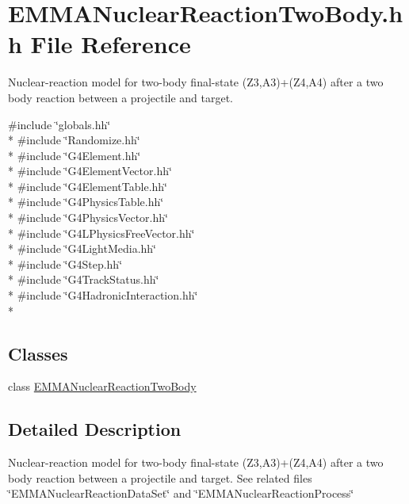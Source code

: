 \hypertarget{EMMANuclearReactionTwoBody_8hh}{\section{E\-M\-M\-A\-Nuclear\-Reaction\-Two\-Body.\-hh File Reference}
\label{EMMANuclearReactionTwoBody_8hh}
}


Nuclear-\/reaction model for two-\/body final-\/state (Z3,A3)+(Z4,A4) after a two body reaction between a projectile and target.  


{\ttfamily \#include \char`\"{}globals.\-hh\char`\"{}}\\*
{\ttfamily \#include \char`\"{}Randomize.\-hh\char`\"{}}\\*
{\ttfamily \#include \char`\"{}G4\-Element.\-hh\char`\"{}}\\*
{\ttfamily \#include \char`\"{}G4\-Element\-Vector.\-hh\char`\"{}}\\*
{\ttfamily \#include \char`\"{}G4\-Element\-Table.\-hh\char`\"{}}\\*
{\ttfamily \#include \char`\"{}G4\-Physics\-Table.\-hh\char`\"{}}\\*
{\ttfamily \#include \char`\"{}G4\-Physics\-Vector.\-hh\char`\"{}}\\*
{\ttfamily \#include \char`\"{}G4\-L\-Physics\-Free\-Vector.\-hh\char`\"{}}\\*
{\ttfamily \#include \char`\"{}G4\-Light\-Media.\-hh\char`\"{}}\\*
{\ttfamily \#include \char`\"{}G4\-Step.\-hh\char`\"{}}\\*
{\ttfamily \#include \char`\"{}G4\-Track\-Status.\-hh\char`\"{}}\\*
{\ttfamily \#include \char`\"{}G4\-Hadronic\-Interaction.\-hh\char`\"{}}\\*
\subsection*{Classes}
\begin{DoxyCompactItemize}
\item 
class \hyperlink{classEMMANuclearReactionTwoBody}{E\-M\-M\-A\-Nuclear\-Reaction\-Two\-Body}
\end{DoxyCompactItemize}


\subsection{Detailed Description}
Nuclear-\/reaction model for two-\/body final-\/state (Z3,A3)+(Z4,A4) after a two body reaction between a projectile and target. See related files \char`\"{}\-E\-M\-M\-A\-Nuclear\-Reaction\-Data\-Set\char`\"{} and \char`\"{}\-E\-M\-M\-A\-Nuclear\-Reaction\-Process\char`\"{} 